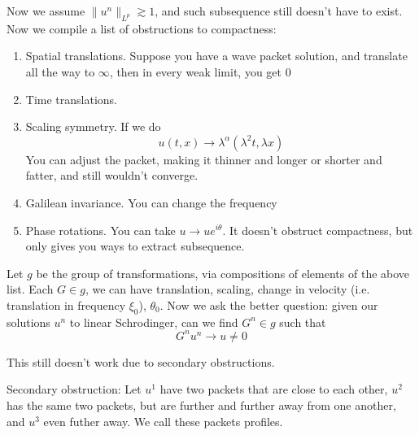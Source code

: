 Now we assume $\|u^n\|_{L^p}\gtrsim 1$, and such subsequence still doesn't have to exist. Now we compile a list of obstructions to compactness:
\begin{enumerate}
    \item Spatial translations. Suppose you have a wave packet solution, and translate all the way to $\infty$, then in every weak limit, you get 0
    \item Time translations.
    \item Scaling symmetry. If we do \begin{equation*}
        u(t,x)\to\lambda^\alpha(\lambda^2t, \lambda x)
    \end{equation*} You can adjust the packet, making it thinner and longer or shorter and fatter, and still wouldn't converge.
    \item Galilean invariance. You can change the frequency
    \item Phase rotations. You can take $u\to ue^{i\theta}$. It doesn't obstruct compactness, but only gives you ways to extract subsequence.
\end{enumerate}
Let $g$ be the group of transformations, via compositions of elements of the above list. Each $G\in g$, we can have translation, scaling, change in velocity (i.e. translation in frequency $\xi_0$), $\theta_0$. Now we ask the better question: given our solutions $u^n$ to linear Schrodinger, can we find $G^n\in g$ such that
\begin{equation*}
    G^nu^n\to u\neq 0
\end{equation*}
\begin{note}
    This still doesn't work due to secondary obstructions.
\end{note}
Secondary obstruction: Let $u^1$ have two packets that are close to each other, $u^2$ has the same two packets, but are further and further away from one another, and $u^3$ even futher away. We call these packets profiles. 

